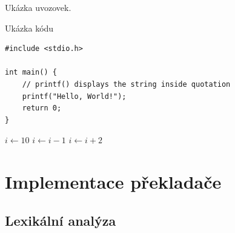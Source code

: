 \documentclass[11pt,a4paper]{article}
\begin{document}
    Ukázka  uvozovek.
    
    Ukázka kódu
    \begin{lstlisting}
#include <stdio.h>

int main() {
    // printf() displays the string inside quotation
    printf("Hello, World!");
    return 0;
}\end{lstlisting}
          
    \begin{algorithmic}
        \State $i \gets 10$
            \State $i \gets i-1$
        \Else
                \State $i \gets i+2$
            \EndIf
        \EndIf 
    \end{algorithmic}        
        
\section{Implementace překladače}
    \subsection{Lexikální analýza}
\end{document}
